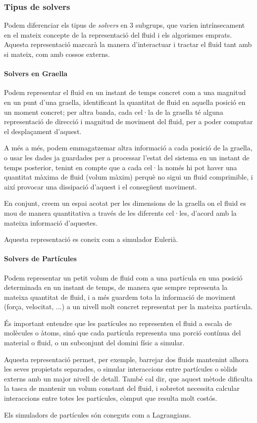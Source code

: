 \documentclass[a4paper]{article} %
\begin{document}
	\subsubsection[Tipus de solvers]{Tipus de solvers}
	Podem diferenciar els tipus de \textit{solvers} en 3 subgrups, que varien intrínsecament en el mateix concepte de la representació del fluid i els algorismes emprats. Aquesta representació marcarà la manera d'interactuar i tractar el fluid tant amb si mateix, com amb cossos externs.
	
	\paragraph[Graella]{\quad Solvers en Graella} Podem representar el fluid en un instant de temps concret com a una magnitud en un punt d'una graella, identificant la quantitat de fluid en aquella posició en un moment concret; per altra banda, cada cel·la de la graella té alguna representació de direcció i magnitud de moviment del fluid, per a poder computar el desplaçament d'aquest. \par
	A més a més, podem emmagatzemar altra informació a cada posició de la graella, o usar les dades ja guardades per a processar l'estat del sistema en un instant de temps posterior, tenint en compte que a cada cel·la només hi pot haver una quantitat màxima de fluid (volum màxim) perquè no sigui un fluid comprimible, i així provocar una dissipació d'aquest i el consegüent moviment.\par
	En conjunt, creem un espai acotat per les dimensions de la graella on el fluid es mou de manera quantitativa a través de les diferents cel·les, d'acord amb la mateixa informació d'aquestes. \par
	Aquesta representació es coneix com a simulador Eulerià.
	
	\paragraph[Partícules]{\quad Solvers de Partícules} Podem representar un petit volum de fluid com a una partícula en una posició determinada en un instant de temps, de manera que sempre representa la mateixa quantitat de fluid, i a més guardem tota la informació de moviment (força, velocitat, ...) a un nivell molt concret representat per la mateixa partícula. \par
	És important entendre que les partícules no representen el fluid a escala de molècules o àtoms, sinó que cada partícula representa una porció contínua del material o fluid, o un subconjunt del domini físic a simular.
	\par
	Aquesta representació permet, per exemple, barrejar dos fluids mantenint alhora les seves propietats separades, o simular interaccions entre partícules o sòlids externs amb un major nivell de detall.
	També cal dir, que aquest mètode dificulta la tasca de mantenir un volum constant del fluid, i sobretot necessita calcular interaccions entre totes les partícules, còmput que resulta molt costós. \par
	Els simuladors de partícules són coneguts com a Lagrangians.
	
\end{document}
